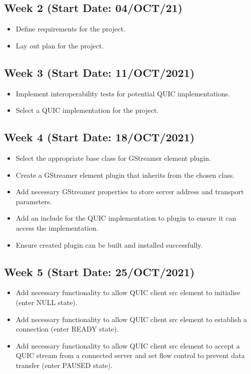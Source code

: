 \documentclass[11pt]{article}
\begin{document}
\subsection{Week 2 (Start Date: 04/OCT/21)}
\begin{itemize}
    \item Define requirements for the project.
    \item Lay out plan for the project.
\end{itemize}
\subsection{Week 3 (Start Date: 11/OCT/2021)}
\begin{itemize}
    \item Implement interoperability tests for potential QUIC implementations.
    \item Select a QUIC implementation for the project.
\end{itemize}
\subsection{Week 4 (Start Date: 18/OCT/2021)}
\begin{itemize}
    \item Select the appropriate base class for GStreamer element plugin.
    \item Create a GStreamer element plugin that inherits from the chosen class.
    \item Add necessary GStreamer properties to store server address and transport parameters.
    \item Add an include for the QUIC implementation to plugin to ensure it can access the implementation.
    \item Ensure created plugin can be built and installed successfully.
\end{itemize}
\subsection{Week 5 (Start Date: 25/OCT/2021)}
\begin{itemize}
    \item Add necessary functionality to allow QUIC client src element to initialise (enter NULL state).
    \item Add necessary functionality to allow QUIC client src element to establish a connection (enter READY state).
    \item Add necessary functionality to allow QUIC client src element to accept a QUIC stream from a connected server and set flow control to prevent data transfer (enter PAUSED state).
\end{itemize}
\end{document}

